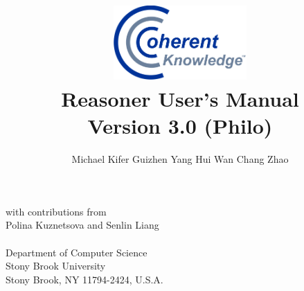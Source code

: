 \documentclass[11pt]{article}
\title{
  \includegraphics[width=2in]{./extensions/ckslogo} 
  \vspace{0.7cm}\\
  \Huge \ERGOAI Reasoner User's Manual
  \vspace{3mm}\\
  {\LARGE Version 3.0 (Philo)}
}
\author{
  Michael Kifer
  \hspace{1cm}
  Guizhen Yang
  \hspace{1cm}
  Hui Wan
  \hspace{1cm}
  Chang Zhao
}
\date{}
\newcommand{\FLORA}{{\mbox{\smaller{\sc ${\cal F}${lora}\rm\emph{-2}}}}\xspace}
\newcommand{\ERGO}{\mbox{\smaller{\ensuremath{\cal{E}}\smaller{{\sc{RGO}}}}}\xspace}
\newcommand{\FLSYSTEM}{\ERGO}
\newcommand{\comment}[1]{}
\newcommand{\FLORAone}{{\mbox{${\cal F}${\sc lora}\emph{-1}}}\xspace}
\newcommand{\FLORID}{{\mbox{\sc Florid}}\xspace}
\newcommand{\fl}{\mbox{F-logic}\xspace}
\begin{document}
\maketitle

\begin{center}
  \large
 with contributions from \\
 \large
 Polina Kuznetsova and Senlin Liang
  \\~\\
  Department of Computer Science\\
  Stony Brook University\\
  Stony Brook, NY 11794-2424, U.S.A.
 \vspace{1.4cm}\\
  \monthname ~\the\year
\end{center}

\thispagestyle{empty}

\newpage

\setcounter{page}{1}

\tableofcontents

\newpage

\setcounter{page}{1}


\comment{
which contains many important extensions and enhancements to \FLORA,
and is proprietary to Coherent Knowledge Systems.
\FLSYSTEM is implemented as a set of run-time
libraries and a compiler that translates a unified language of \fl
\cite{KLW95}, HiLog \cite{hilog-jlp}, Transaction Logic
\cite{trans-chapter-98,trans-tcs94}, and defeasible reasoning
\cite{lpda-iclp-09} into tabled Prolog code.

Applications of \FLSYSTEM include intelligent agents, Semantic Web, ontology
management, integration of information, and others. 

\index{FLIP}
\index{FLORID}
The language of \FLSYSTEM is a dialect of \fl with
numerous extensions, which include a natural way to do meta-programming in
the style of HiLog, logical updates in the style of Transaction
Logic, and a form of \emph{defeasible reasoning} described in
\cite{lpda-iclp-09}. \FLSYSTEM was designed with extensibility and flexibility in mind, and
it provides strong support for modular software development through its unique
feature of on-the-fly modules.
Other extensions, such as the versatile syntax of \FLORID path
expressions, are borrowed from
\FLORID, a C++-based \fl system developed at
Freiburg University.\footnote{
  \url{http://www.informatik.uni-freiburg.de/~dbis/florid/}.
}
Extensions aside, the syntax of \FLSYSTEM differs in many
important ways from \FLORID, from the original version of \fl, as described
in \cite{KLW95}, and from an earlier implementation, \FLORAone. These
syntax changes made the system more user-friendly and practical.

\FLSYSTEM is available at \url{http://flora.sourceforge.net}.
This manual will mostly refer to the system under its traditional name,
\FLSYSTEM.
}
\end{document}
